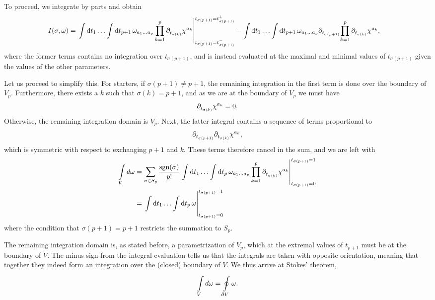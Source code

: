 To proceed, we integrate by parts and obtain
\begin{align*}
	I(\sigma, \omega) &= \eval{\inte{}{}\dd{t_{1}}{\dots \inte{}{}\dd{t_{p + 1}}{\omega_{a_{1}\dots a_{p}}\prod\limits_{k = 1}^{p}\del{}{t_{\sigma(k)}}{\chi^{a_{k}}}}}}_{t_{\sigma(p + 1)} = t_{\sigma(p + 1)}^{-}}^{t_{\sigma(p + 1)} = t_{\sigma(p + 1)}^{+}} - \inte{}{}\dd{t_{1}}{\dots \inte{}{}\dd{t_{p + 1}}{\omega_{a_{1}\dots a_{p}}\del{}{t_{\sigma(p + 1)}}{\prod\limits_{k = 1}^{p}\del{}{t_{\sigma(k)}}{\chi^{a_{k}}}}}},
\end{align*}
where the former terms contains no integration over $t_{\sigma(p + 1)}$, and is instead evaluated at the maximal and minimal values of $t_{\sigma(p + 1)}$ given the values of the other parameters.

Let us proceed to simplify this. For starters, if $\sigma(p + 1) \neq p + 1$, the remaining integration in the first term is done over the boundary of $V_{p}$. Furthermore, there exists a $k$ such that $\sigma(k) = p + 1$, and as we are at the boundary of $V_{p}$ we must have
\begin{align*}
	\partial^{}_{t_{\sigma(k)}}{\chi^{a_{k}}} = 0.
\end{align*}
Otherwise, the remaining integration domain is $V_{p}$. Next, the latter integral contains a sequence of terms proportional to
\begin{align*}
	\partial^{}_{t_{\sigma(p + 1)}}{\partial^{}_{t_{\sigma(k)}}{\chi^{a_{k}}}},
\end{align*}
which is symmetric with respect to exchanging $p + 1$ and $k$. These terms therefore cancel in the sum, and we are left with
\begin{align*}
	\inte{V}{}\df{\omega} &= \sum\limits_{\sigma\in S_{p}}\frac{\text{sgn}(\sigma)}{p!}\eval{\inte{}{}\dd{t_{1}}{\dots \inte{}{}\dd{t_{p}}{\omega_{a_{1}\dots a_{p}}\prod\limits_{k = 1}^{p}\del{}{t_{\sigma(k)}}{\chi^{a_{k}}}}}}_{t_{\sigma(p + 1)} = 0}^{t_{\sigma(p + 1)} = 1} \\
	                      &= \eval{\inte{}{}\dd{t_{1}}{\dots \inte{}{}\dd{t_{p}}{\omega}}}_{t_{\sigma(p + 1)} = 0}^{t_{\sigma(p + 1)} = 1}
\end{align*}
where the condition that $\sigma(p + 1) = p + 1$ restricts the summation to $S_{p}$.

The remaining integration domain is, as stated before, a parametrization of $V_{p}$, which at the extremal values of $t_{p + 1}$ must be at the boundary of $V$. The minus sign from the integral evaluation tells us that the integrals are taken with opposite orientation, meaning that together they indeed form an integration over the (closed) boundary of $V$. We thus arrive at Stokes' theorem,
\begin{align*}
	\int\limits_{V}^{}d\omega = \oint\limits_{\partial V}\omega.
\end{align*}

